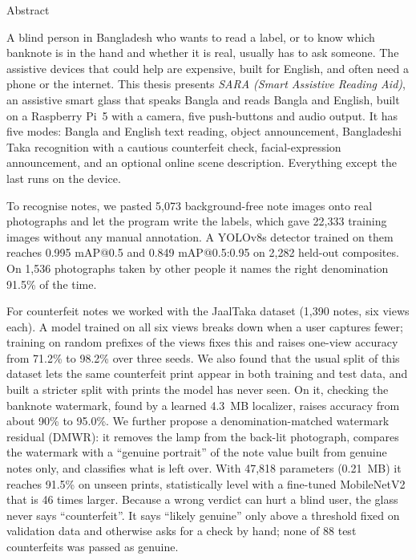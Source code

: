 \clearpage
\begin{center}
    {\headingfont\LARGE Abstract}

\end{center}
\vspace{1.5cm}
\par
A blind person in Bangladesh who wants to read a label, or to know which banknote is in the hand and whether it is real, usually has to ask someone. The assistive devices that could help are expensive, built for English, and often need a phone or the internet. This thesis presents \textit{SARA (Smart Assistive Reading Aid)}, an assistive smart glass that speaks Bangla and reads Bangla and English, built on a Raspberry Pi~5 with a camera, five push-buttons and audio output. It has five modes: Bangla and English text reading, object announcement, Bangladeshi Taka recognition with a cautious counterfeit check, facial-expression announcement, and an optional online scene description. Everything except the last runs on the device.

To recognise notes, we pasted 5,073 background-free note images onto real photographs and let the program write the labels, which gave 22,333 training images without any manual annotation. A YOLOv8s detector trained on them reaches 0.995 mAP@0.5 and 0.849 mAP@0.5:0.95 on 2,282 held-out composites. On 1,536 photographs taken by other people it names the right denomination 91.5\% of the time.

For counterfeit notes we worked with the JaalTaka dataset (1,390 notes, six views each). A model trained on all six views breaks down when a user captures fewer; training on random prefixes of the views fixes this and raises one-view accuracy from 71.2\% to 98.2\% over three seeds. We also found that the usual split of this dataset lets the same counterfeit print appear in both training and test data, and built a stricter split with prints the model has never seen. On it, checking the banknote watermark, found by a learned 4.3~MB localizer, raises accuracy from about 90\% to 95.0\%. We further propose a denomination-matched watermark residual (DMWR): it removes the lamp from the back-lit photograph, compares the watermark with a ``genuine portrait'' of the note value built from genuine notes only, and classifies what is left over. With 47,818 parameters (0.21~MB) it reaches 91.5\% on unseen prints, statistically level with a fine-tuned MobileNetV2 that is 46 times larger. Because a wrong verdict can hurt a blind user, the glass never says ``counterfeit''. It says ``likely genuine'' only above a threshold fixed on validation data and otherwise asks for a check by hand; none of 88 test counterfeits was passed as genuine.


